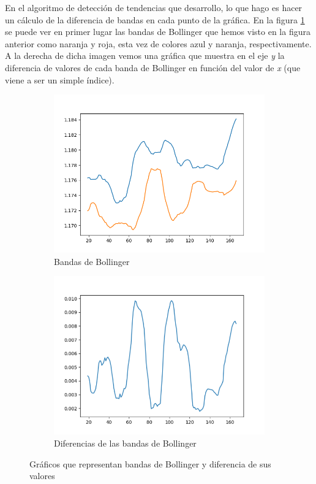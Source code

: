 En el algoritmo de detección de tendencias que desarrollo, lo que hago es hacer un cálculo de la diferencia de bandas en cada punto de la gráfica. En la figura \ref{diferencia_bandas} se puede ver en primer lugar las bandas de Bollinger que hemos visto en la figura anterior como naranja y roja, esta vez de colores azul y naranja, respectivamente. A la derecha de dicha imagen vemos una gráfica que muestra en el eje \textit{y} la diferencia de valores de cada banda de Bollinger en función del valor de \textit{x} (que viene a ser un simple índice).\newline

\begin{figure}[!tbp]
	\begin{subfigure}[b]{0.6\textwidth}
		\includegraphics[width=\textwidth]{imagenes/solo_bollinger.png}
		\caption{Bandas de Bollinger}
	\end{subfigure}
	\hfill
	\begin{subfigure}[b]{0.6\textwidth}
		\includegraphics[width=\textwidth]{imagenes/diferencias_bollinger.png}
		\caption{Diferencias de las bandas de Bollinger}
	\end{subfigure}
	
	\caption{Gráficos que representan bandas de Bollinger y diferencia de sus valores} \label{diferencia_bandas}
\end{figure}

